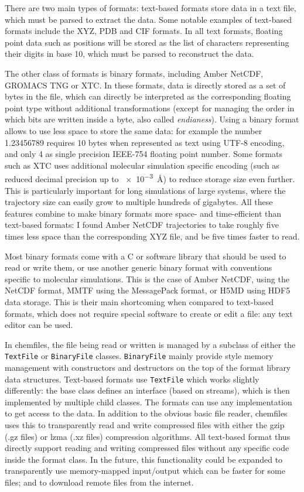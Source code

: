 \documentclass[thesis]{subfiles}
\begin{document}
There are two main types of formats: text-based formats store data in a text
file, which must be parsed to extract the data. Some notable examples of
text-based formats include the XYZ, PDB and CIF formats. In all text formats,
floating point data such as positions will be stored as the list of characters
representing their digits in base 10, which must be parsed to reconstruct the
data.

The other class of formats is binary formats, including Amber NetCDF,
GROMACS TNG or XTC. In these formats, data is directly stored as a set of bytes
in the file, which can directly be interpreted as the corresponding floating
point type without additional transformations (except for managing the order in
which bits are written inside a byte, also called \emph{endianess}). Using a
binary format allows to use less space to store the same data: for example the
number 1.23456789 requires 10 bytes when represented as text using UTF-8
encoding, and only 4 as single precision IEEE-754 floating point number. Some
formats such as XTC uses additional molecular simulation specific encoding (such
as reduced decimal precision up to \SI{e-3}{\AA}) to reduce storage size even
further. This is particularly important for long simulations of large systems,
where the trajectory size can easily grow to multiple hundreds of gigabytes. All
these features combine to make binary formats more space- and time-efficient
than text-based formats: I found Amber NetCDF trajectories to take roughly five
times less space than the corresponding XYZ file, and be five times faster to
read.

Most binary formats come with a C or \cxx software library that should be used
to read or write them, or use another generic binary format with conventions
specific to molecular simulations. This is the case of Amber NetCDF, using the
NetCDF format\cite{AmberNetCDF}, MMTF using the MessagePack
format\cite{Bradley2017}, or H5MD using HDF5 data storage\cite{DeBuyl2014}.
This is their main shortcoming when compared to text-based formats, which does
not require special software to create or edit a file: any text editor can be
used.

In chemfiles, the file being read or written is managed by a subclass of either
the \texttt{TextFile} or \texttt{BinaryFile} classes. \texttt{BinaryFile} mainly
provide \cxx style memory management with constructors and destructors on the
top of the format library data structures. Text-based formats use
\texttt{TextFile} which works slightly differently: the base class defines an
interface (based on \cxx streams), which is then implemented by multiple child
classes. The formats can use any implementation to get access to the data. In
addition to the obvious basic file reader, chemfiles uses this to transparently
read and write compressed files with either the gzip (.gz files) or lzma (.xz
files) compression algorithms. All text-based format thus directly support
reading and writing compressed files without any specific code inside the format
class. In the future, this functionality could be expanded to transparently use
memory-mapped input/output which can be faster for some files; and to download
remote files from the internet.
\end{document}
